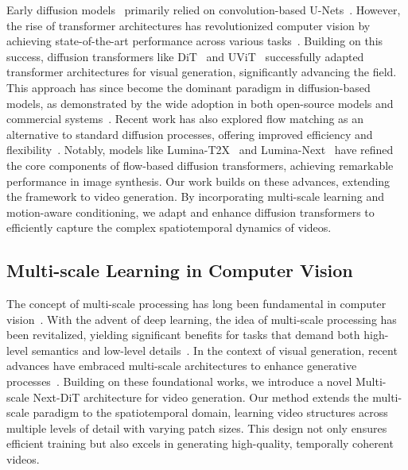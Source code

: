Early diffusion models~\citep{DDPM,DDIM} primarily relied on convolution-based U-Nets~\citep{u-net}. However, the rise of transformer architectures has revolutionized computer vision by achieving state-of-the-art performance across various tasks~\citep{vit,detr,mae}. Building on this success, diffusion transformers like DiT~\citep{DiT} and UViT~\citep{UViT} successfully adapted transformer architectures for visual generation, significantly advancing the field. This approach has since become the dominant paradigm in diffusion-based models, as demonstrated by the wide adoption in both open-source models and commercial systems~\citep{sd3,latte,pixartalpha,pixartsigma,openai2024sora}. Recent work has also explored flow matching as an alternative to standard diffusion processes, offering improved efficiency and flexibility~\citep{FlowMatching,FlowMatchingGuide,RectifiedFlow,SiT}. Notably, models like Lumina-T2X~\citep{luminat2x} and Lumina-Next~\citep{luminanext} have refined the core components of flow-based diffusion transformers, achieving remarkable performance in image synthesis. Our work builds on these advances, extending the framework to video generation. By incorporating multi-scale learning and motion-aware conditioning, we adapt and enhance diffusion transformers to efficiently capture the complex spatiotemporal dynamics of videos.

\subsection{Multi-scale Learning in Computer Vision}

The concept of multi-scale processing has long been fundamental in computer vision~\citep{Koenderink2004TheSO,Burt1983TheLP,Adelson1984PYRAMIDMI}.
With the advent of deep learning, the idea of multi-scale processing has been revitalized, yielding significant benefits for tasks that demand both high-level semantics and low-level details~\citep{FPN,deeplab,PredictingDepth,multiscaleinteractive,AttentionTosSale,AUnifiedMulti,multiscalehigh,multiscalevision,swintransformer,featurepyramidtransformer}. 
In the context of visual generation, recent advances have embraced multi-scale architectures to enhance generative processes~\citep{hierarchicalpatchdiffusion,xiaoyu2024multiscale,matryoshkadiffusion,lego,PyramidFlow}. 
Building on these foundational works, we introduce a novel Multi-scale Next-DiT architecture for video generation. Our method extends the multi-scale paradigm to the spatiotemporal domain, learning video structures across multiple levels of detail with varying patch sizes. This design not only ensures efficient training but also excels in generating high-quality, temporally coherent videos.